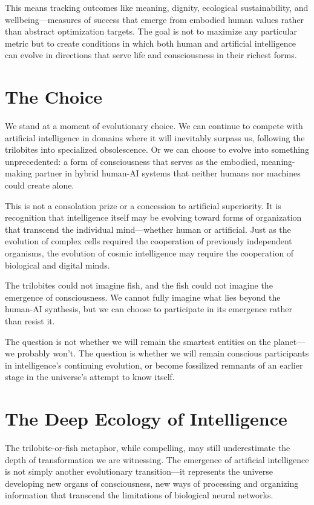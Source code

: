 This means tracking outcomes like meaning, dignity, ecological sustainability, and wellbeing—measures of success that emerge from embodied human values rather than abstract optimization targets. The goal is not to maximize any particular metric but to create conditions in which both human and artificial intelligence can evolve in directions that serve life and consciousness in their richest forms.

\section{The Choice}

We stand at a moment of evolutionary choice. We can continue to compete with artificial intelligence in domains where it will inevitably surpass us, following the trilobites into specialized obsolescence. Or we can choose to evolve into something unprecedented: a form of consciousness that serves as the embodied, meaning-making partner in hybrid human-AI systems that neither humans nor machines could create alone.

This is not a consolation prize or a concession to artificial superiority. It is recognition that intelligence itself may be evolving toward forms of organization that transcend the individual mind—whether human or artificial. Just as the evolution of complex cells required the cooperation of previously independent organisms, the evolution of cosmic intelligence may require the cooperation of biological and digital minds.

The trilobites could not imagine fish, and the fish could not imagine the emergence of consciousness. We cannot fully imagine what lies beyond the human-AI synthesis, but we can choose to participate in its emergence rather than resist it.

The question is not whether we will remain the smartest entities on the planet—we probably won't. The question is whether we will remain conscious participants in intelligence's continuing evolution, or become fossilized remnants of an earlier stage in the universe's attempt to know itself.

\section{The Deep Ecology of Intelligence}

The trilobite-or-fish metaphor, while compelling, may still underestimate the depth of transformation we are witnessing. The emergence of artificial intelligence is not simply another evolutionary transition—it represents the universe developing new organs of consciousness, new ways of processing and organizing information that transcend the limitations of biological neural networks.

